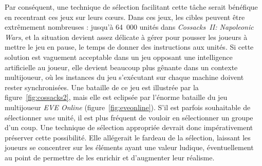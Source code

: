 	Par conséquent, une technique de sélection facilitant cette tâche serait bénéfique en recentrant ces jeux sur leurs cœurs. Dans ces jeux, les cibles peuvent être extrêmement nombreuses : jusqu'à 64~000 unités dans \emph{Cossacks~II: Napoleonic Wars}, et la situation devient assez délicate à gérer pour pousser les joueurs à mettre le jeu en pause, le temps de donner des instructions aux unités.\footnotemark{} Si cette solution est vaguement acceptable dans un jeu opposant une intelligence artificielle au joueur, elle devient beaucoup plus gênante dans un contexte multijoueur, où les instances du jeu s'exécutant sur chaque machine doivent rester synchronisées. Une bataille de ce jeu est illustrée par la figure~\ref{fig:cossacks2}, mais elle est eclipsée par l'énorme bataille du jeu multijoueur \emph{EVE Online} (figure~\ref{fig:eveonline}). S'il est parfois souhaitable de sélectionner \emph{une} unité, il est plus fréquent de vouloir en sélectionner un groupe d'un coup. Une technique de sélection appropriée devrait donc impérativement préserver cette possibilité. Elle allégerait le fardeau de la sélection, laissant les joueurs se concentrer sur les éléments ayant une valeur ludique, éventuellement au point de permettre de les enrichir et d'augmenter leur réalisme.
	

